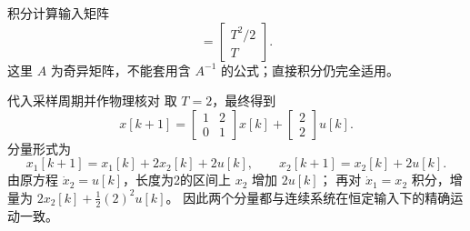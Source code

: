 \documentclass[11pt]{article}
\begin{document}
\begin{solution}
\begin{proofstep}{积分计算输入矩阵}
\[=\begin{bmatrix}T^2/2\\T\end{bmatrix}.
\]
这里 $A$ 为奇异矩阵，不能套用含 $A^{-1}$ 的公式；直接积分仍完全适用。
\end{proofstep}
\begin{proofstep}{代入采样周期并作物理核对}
取 $T=2$，最终得到
\[
\boxed{x[k+1]=\begin{bmatrix}1&2\\0&1\end{bmatrix}x[k]+
\begin{bmatrix}2\\2\end{bmatrix}u[k].}
\]
分量形式为
\[
x_1[k+1]=x_1[k]+2x_2[k]+2u[k],\qquad
x_2[k+1]=x_2[k]+2u[k].
\]
由原方程 $\dot x_2=u[k]$，长度为2的区间上 $x_2$ 增加 $2u[k]$；
再对 $\dot x_1=x_2$ 积分，增量为 $2x_2[k]+\tfrac12(2)^2u[k]$。
因此两个分量都与连续系统在恒定输入下的精确运动一致。
\end{proofstep}
\end{solution}
\end{document}

